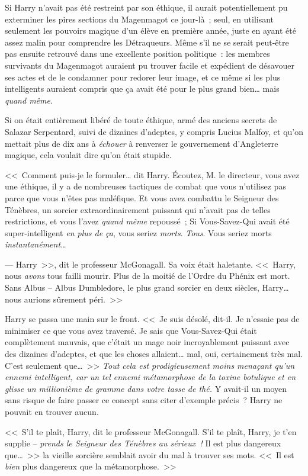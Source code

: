Si Harry n'avait pas été restreint par son éthique, il aurait potentiellement pu exterminer les pires sections du Magenmagot ce jour-là~; seul, en utilisant seulement les pouvoirs magique d'un élève en première année, juste en ayant été assez malin pour comprendre les Détraqueurs. Même s'il ne se serait peut-être pas ensuite retrouvé dans une excellente position politique~: les membres survivants du Magenmagot auraient pu trouver facile et expédient de désavouer ses actes et de le condamner pour redorer leur image, et ce même si les plus intelligents auraient compris que ça avait été pour le plus grand bien… mais \emph{quand même}.

Si on était entièrement libéré de toute éthique, armé des anciens secrets de Salazar Serpentard, suivi de dizaines d'adeptes, y compris Lucius Malfoy, et qu'on mettait plus de dix ans à \emph{échouer} à renverser le gouvernement d'Angleterre magique, cela voulait dire qu'on était stupide.

<<~Comment puis-je le formuler… dit Harry. Écoutez, M. le directeur, vous avez une éthique, il y a de nombreuses tactiques de combat que vous n'utilisez pas parce que vous n'êtes pas maléfique. Et vous avez combattu le Seigneur des Ténèbres, un sorcier extraordinairement puissant qui n'avait pas de telles restrictions, et vous l'avez \emph{quand même} repoussé~; Si Vous-Savez-Qui avait été super-intelligent \emph{en plus de ça}, vous seriez \emph{morts}. \emph{Tous}. Vous seriez morts \emph{instantanément…}

--- Harry~>>, dit le professeur McGonagall. Sa voix était haletante. <<~Harry, nous \emph{avons} tous failli mourir. Plus de la moitié de l'Ordre du Phénix est mort. Sans Albus -- Albus Dumbledore, le plus grand sorcier en deux siècles, Harry… nous aurions sûrement péri.~>>

Harry se passa une main sur le front. <<~Je suis désolé, dit-il. Je n'essaie pas de minimiser ce que vous avez traversé. Je sais que Vous-Savez-Qui était complètement mauvais, que c'était un mage noir incroyablement puissant avec des dizaines d'adeptes, et que les choses allaient… mal, oui, certainement très mal. C'est seulement que…~>> \emph{Tout cela est prodigieusement moins menaçant qu'un ennemi intelligent, car un tel ennemi métamorphose de la toxine botulique et en glisse un millionième de gramme dans votre tasse de thé.} Y avait-il un moyen sans risque de faire passer ce concept sans citer d'exemple précis~? Harry ne pouvait en trouver aucun.

<<~S'il te plaît, Harry, dit le professeur McGonagall. S'il te plaît, Harry, je t'en supplie -- \emph{prends le Seigneur des Ténèbres au sérieux~!} Il est plus dangereux que…~>> la vieille sorcière semblait avoir du mal à trouver ses mots. <<~Il est \emph{bien} plus dangereux que la métamorphose.~>>

